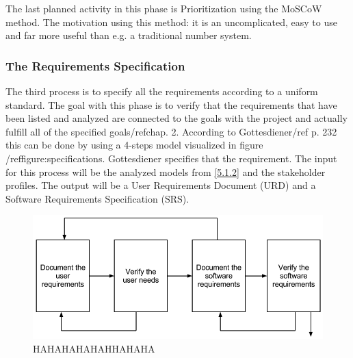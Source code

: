 \documentclass[a4paper]{article}
\begin{document}
The last planned activity in this phase is Prioritization using the MoSCoW method. The motivation using this method: it is an uncomplicated, easy to use and far more useful than e.g. a traditional number system\cite{http://www.coleyconsulting.co.uk/moscow.htm}.

\subsubsection{The Requirements Specification}
\label{subsub:the_requirements_specification}

The third process is to specify all the requirements according to a uniform standard. The goal with this phase is to verify that the requirements that have been listed and analyzed are connected to the goals with the project and actually fulfill all of the specified goals/ref{chap. 2}. According to Gottesdiener/ref{ p. 232} this can be done by using a 4-steps model visualized in figure /ref{figure:specifications}. Gottesdiener specifies that the requirement. The input for this process will be the analyzed models from \ref{5.1.2} and the stakeholder profiles. The output will be a User Requirements Document (URD) and a Software Requirements Specification (SRS).

\begin{figure}
	\centering
		\includegraphics[width=1\textwidth]{images/specifications_model.png}
	\caption{HAHAHAHAHAHHAHAHA}
	\label{figure:specifications}
\end{figure}
\end{document}
